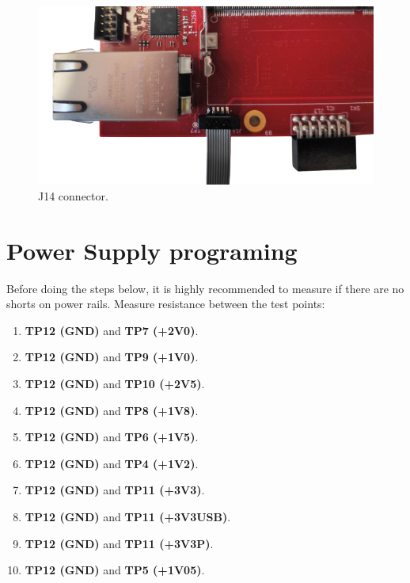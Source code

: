 \documentclass[12pt,oneside,a4]{article}
\begin{document}
\begin{figure}[H]
\begin{center}
\includegraphics[width=0.8\linewidth]{mmcjtag.png}
 \caption{J14 connector. }\label{23}
\end{center}
\end{figure}



\section{Power Supply programing}
Before doing the steps below, it is highly recommended to measure if there are no shorts on power rails. Measure resistance between the test points:

\begin{enumerate}
    \item \textbf{TP12 (GND)} and \textbf{TP7 (+2V0)}.
    \item \textbf{TP12 (GND)} and \textbf{TP9 (+1V0)}.
    \item \textbf{TP12 (GND)} and \textbf{TP10 (+2V5)}.
    \item \textbf{TP12 (GND)} and \textbf{TP8 (+1V8)}.
    \item \textbf{TP12 (GND)} and \textbf{TP6 (+1V5)}.
    \item \textbf{TP12 (GND)} and \textbf{TP4 (+1V2)}.
    \item \textbf{TP12 (GND)} and \textbf{TP11 (+3V3)}.
    \item \textbf{TP12 (GND)} and \textbf{TP11 (+3V3USB)}.
    \item \textbf{TP12 (GND)} and \textbf{TP11 (+3V3P)}.
    \item \textbf{TP12 (GND)} and \textbf{TP5 (+1V05)}.
\end{enumerate}
\end{document}
